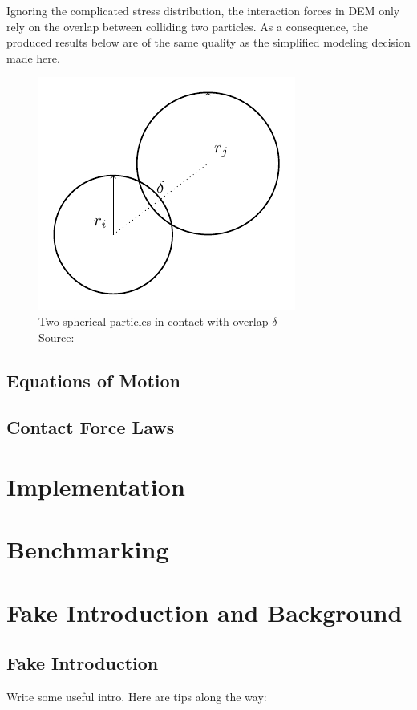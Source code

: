 \documentclass[11pt,
               a4paper,
               bibtotoc,
               idxtotoc,
               headsepline,
               footsepline,
               footexclude,
               BCOR12mm,
               DIV13,
               openany,   %
               ]
               {scrbook}
\begin{document}
Ignoring the complicated stress distribution, the interaction forces in DEM only rely on the overlap between colliding two particles. As a consequence, the produced results below are of the same quality as the simplified modeling decision made here. 

    \begin{figure}[H] %
	\centering
	\includegraphics[width=.3\columnwidth]{figures/discrete_spherical_particle_model.pdf}
	\caption[Example Figure]{Two spherical particles in contact with overlap $\delta$ \\
		\tiny{Source: \cite{gratl17task}}}
	\label{fig:discrete_spherical_particle_model} %
\end{figure}

\chapter{Equations of Motion}
\chapter{Contact Force Laws}

\part{Implementation}

\part{Benchmarking}

\part{Fake Introduction and Background}
\chapter{Fake Introduction}
\label{sec:intro}       %
Write some useful intro. Here are tips along the way:
\end{document}
